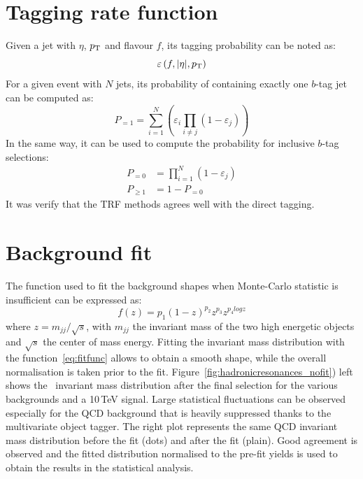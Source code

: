 \section{Tagging rate function}%
\label{sec:app:trf}
Given a jet with $\eta$, $p_{\text{T}}$ and flavour $f$, its tagging probability can be noted as:
\begin{equation*}
	\varepsilon \left(f,|\eta|,p_{\text{T}}\right)
\end{equation*}
\newline
For a given event with $N$ jets, its probability of containing exactly one $b$-tag jet can be computed as:
\begin{equation*}
	P_{=1} = \sum\limits_{i=1}^N \left( \varepsilon_{i} \prod\limits_{i \neq j} \left( 1 - \varepsilon_{j} \right) \right)
\end{equation*}
\newline
In the same way, it can be used to compute the probability for inclusive $b$-tag selections:
\begin{align*}
	P_{=0} &= \prod\limits_{i=1}^N \left( 1 - \varepsilon_{j} \right) \\
	P_{\geq 1} &= 1 - P_{=0}
\end{align*}
\newline
It was verify that the TRF methods agrees well with the direct tagging.


\section{Background fit}%
\label{sec:app:bgfit}
The function used to fit the background shapes when Monte-Carlo statistic is insufficient can be expressed as:
\begin{equation}
\label{eq:fitfunc}
f(z)=p_1(1-z)^{p_2}z^{p_3}z^{p_{4}logz}
\end{equation}
where $z=m_{jj}/\sqrt{s}$, with $m_{jj}$ the invariant mass of the two high energetic objects and $\sqrt{s}$ the center of mass energy. Fitting the invariant mass distribution with the function~\ref{eq:fitfunc} allows to obtain a smooth shape, while the overall normalisation is taken prior to the fit. Figure~\ref{fig:hadronicresonances_nofit}) left shows the \Zptt\ invariant mass distribution after the final selection for the various backgrounds and a 10\,TeV signal. Large statistical fluctuations can be observed especially for the QCD background that is heavily suppressed thanks to the multivariate object tagger. The right plot represents the same QCD invariant mass distribution before the fit (dots) and after the fit (plain). Good agreement is observed and the fitted distribution normalised to the pre-fit yields is used to obtain the results in the statistical analysis.

